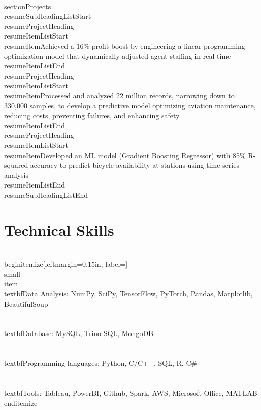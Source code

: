 \documentclass[letterpaper,11pt]{article}
\makeatletter
\newcommand{\resumeItem}[1]{
  \item\small{
    {#1 \vspace{-2pt}}
  }
}
\newcommand{\resumeProjectHeading}[2]{
    \item
    \begin{tabular*}{0.97\textwidth}{l@{\extracolsep{\fill}}r}
      \small#1 & #2 \\
    \end{tabular*}\vspace{-7pt}
}
\newcommand{\resumeSubHeadingListStart}{\begin{itemize}[leftmargin=0.15in, label={}]}
\newcommand{\resumeSubHeadingListEnd}{\end{itemize}}
\newcommand{\resumeItemListStart}{\begin{itemize}}
\newcommand{\resumeItemListEnd}{\end{itemize}\vspace{-5pt}}
\makeatother
\begin{document}
\\section{Projects}\n    \\resumeSubHeadingListStart\n      \\resumeProjectHeading{}\n          \\resumeItemListStart\n            \\resumeItem{Achieved a 16\% profit boost by engineering a linear programming optimization model that dynamically adjusted agent staffing in real-time}\n          \\resumeItemListEnd\n      \\resumeProjectHeading{}\n          \\resumeItemListStart\n            \\resumeItem{Processed and analyzed 22 million records, narrowing down to 330,000 samples, to develop a predictive model optimizing aviation maintenance, reducing costs, preventing failures, and enhancing safety}\n          \\resumeItemListEnd\n      \\resumeProjectHeading{}\n          \\resumeItemListStart\n            \\resumeItem{Developed an ML model (Gradient Boosting Regressor) with 85\% R-squared accuracy to predict bicycle availability at stations using time series analysis}\n          \\resumeItemListEnd\n    \\resumeSubHeadingListEnd\n
\section{Technical Skills}
 \\begin{itemize}[leftmargin=0.15in, label={}]
    \\small{\\item{
     \\textbf{Data Analysis}{: NumPy, SciPy, TensorFlow, PyTorch, Pandas, Matplotlib, BeautifulSoup} \\\\      \\textbf{Database}{: MySQL, Trino SQL, MongoDB} \\\\      \\textbf{Programming languages}{: Python, C/C++, SQL, R, C\#} \\\\      \\textbf{Tools}{: Tableau, PowerBI, Github, Spark, AWS, Microsoft Office, MATLAB}
    }}
 \\end{itemize}
\end{document}
